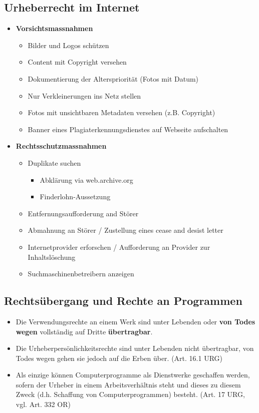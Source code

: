\subsection{Urheberrecht im Internet}

\begin{itemize}
	\item \textbf{Vorsichtsmassnahmen}
	\begin{itemize}
		\item Bilder und Logos schützen
		\item Content mit Copyright versehen
		\item Dokumentierung der Alterspriorität (Fotos mit Datum)
		\item Nur Verkleinerungen ins Netz stellen
		\item Fotos mit unsichtbaren Metadaten versehen (z.B. Copyright)
		\item Banner eines Plagiaterkennungsdienstes auf Webseite aufschalten
	\end{itemize}
	\item \textbf{Rechtsschutzmassnahmen}
	\begin{itemize}
		\item Duplikate suchen
		\begin{itemize}
			\item Abklärung via web.archive.org
			\item Finderlohn-Aussetzung
		\end{itemize}
		\item Entfernungsaufforderung and Störer
		\item Abmahnung an Störer / Zustellung eines cease and desist letter
		\item Internetprovider erforschen / Aufforderung an Provider zur
		Inhaltslöschung
		\item Suchmaschinenbetreibern anzeigen
	\end{itemize}
\end{itemize}

\subsection{Rechtsübergang und Rechte an Programmen}
\label{sec:Urheberrecht-Rechtsübergang}
\begin{itemize}
	\tightlist
	\item Die Verwendungsrechte an einem Werk sind unter Lebenden oder
	\textbf{von Todes wegen} vollständig auf Dritte \textbf{übertragbar}.
	\item Die Urheberpersönlichkeitsrechte sind unter Lebenden nicht
	übertragbar, von Todes wegen gehen sie jedoch auf die Erben über.
	(Art. 16.1 URG)
	\item Als einzige können Computerprogramme als Dienstwerke geschaffen
	werden, sofern der Urheber in einem Arbeitsverhältnis steht und dieses
	zu diesem Zweck (d.h. Schaffung von Computerprogrammen) besteht.
	(Art. 17 URG, vgl. Art. 332 OR)
\end{itemize}


